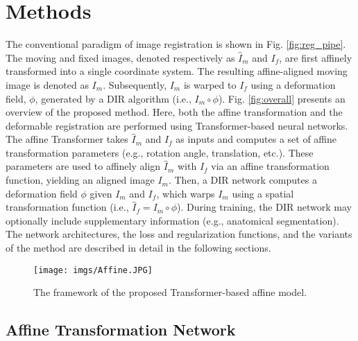 \documentclass[times,twocolumn,final]{elsarticle}
\begin{document}
\section{Methods}
\label{sec:methods}
The conventional paradigm of image registration is shown in Fig. \ref{fig:reg_pipe}. The moving and fixed images, denoted respectively as $\hat{I}_m$ and $I_f$, are first affinely transformed into a single coordinate system. The resulting affine-aligned moving image is denoted as $I_m$. Subsequently, $I_m$ is warped to $I_f$ using a deformation field, $\phi$, generated by a DIR algorithm (i.e., $I_m\circ\phi$). Fig. \ref{fig:overall} presents an overview of the proposed method. Here, both the affine transformation and the deformable registration are performed using Transformer-based neural networks. The affine Transformer takes $\hat{I}_m$ and $I_f$ as inputs and computes a set of affine transformation parameters (e.g., rotation angle, translation, etc.). These parameters are used to affinely align $\hat{I}_m$ with $I_f$ via an affine transformation function, yielding an aligned image $I_m$. Then, a DIR network computes a deformation field $\phi$ given $I_m$ and $I_f$, which warps $I_m$ using a spatial transformation function (i.e., $\hat{I}_f=I_m\circ\phi$). During training, the DIR network may optionally include supplementary information (e.g., anatomical segmentation). The network architectures, the loss and regularization functions, and the variants of the method are described in detail in the following sections.

\begin{figure}[!h]
\centering
\texttt{[image: imgs/Affine.JPG]}
\caption{The framework of the proposed Transformer-based affine model.}
\end{figure}
\subsection{Affine Transformation Network}
\end{document}
